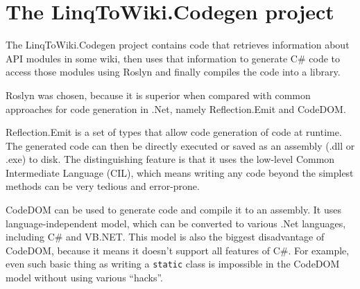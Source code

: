 \section{The LinqToWiki.Codegen project}
\label{ltwc}

The LinqToWiki.Codegen project contains code that retrieves information about API modules in some wiki,
then uses that information to generate C\# code to access those modules using Roslyn
and finally compiles the code into a library.

\medskip

Roslyn was chosen, because it is superior when compared with common approaches for code generation in .Net,
namely Reflection.Emit and CodeDOM.

Reflection.Emit \cite{reflection-emit} is a set of types that allow code generation of code at runtime.
The generated code can then be directly executed or saved as an assembly (.dll or .exe) to disk.
The distinguishing feature is that it uses the low-level Common Intermediate Language (CIL),
which means writing any code beyond the simplest methods can be very tedious and error-prone.

CodeDOM \cite{codedom} can be used to generate code and compile it to an assembly.
It uses language-independent model, which can be converted to various .Net languages,
including C\# and VB.NET.
This model is also the biggest disadvantage of CodeDOM, because it means it doesn't support all features of C\#.
For example, even such basic thing as writing a \lstinline{static} class is impossible in the CodeDOM model
without using various ``hacks''.

\medskip